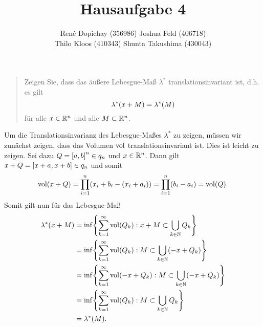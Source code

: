 \documentclass{exercise}
\title{Hausaufgabe 4}
\author{René Dopichay (356986) \quad Joshua Feld (406718)\\Thilo Kloos (410343) \quad Shunta Takushima (430043)}
\begin{document}
	\maketitle


	\section{}

    \begin{quote}
        Zeigen Sie, dass das äußere Lebesgue-Maß \(\lambda^*\) translationsinvariant ist, d.h. es gilt
        \[
            \lambda^*\parentheses*{x + M} = \lambda^*\parentheses*{M}
        \]
        für alle \(x \in \R^n\) und alle \(M \subset \R^n\).
    \end{quote}

    Um die Translationsinvarianz des Lebesgue-Maßes \(\lambda^*\) zu zeigen, müssen wir zunächst zeigen, dass das Volumen \(\vol\) translationsinvariant ist. Dies ist leicht zu zeigen.
    Sei dazu \(Q = \brackets*{a, b}^n \in q_n\) und \(x \in \R^n\).
    Dann gilt \(x + Q = \brackets*{x + a, x + b} \in q_n\) und somit
    \[
        \vol\parentheses*{x + Q} = \prod_{i = 1}^n \parentheses*{x_i + b_i - \parentheses*{x_i + a_i}} = \prod_{i = 1}^n \parentheses*{b_i - a_i} = \vol\parentheses*{Q}.
    \]
    Somit gilt nun für das Lebesgue-Maß
    \begin{align*}
        \lambda^*\parentheses*{x + M} &= \inf\braces*{\sum_{k = 1}^\infty \vol\parentheses*{Q_k} : x + M \subset \bigcup_{k \in \N}Q_k}\\
        &= \inf\braces*{\sum_{k = 1}^\infty \vol\parentheses*{Q_k} : M \subset \bigcup_{k \in \N}\parentheses*{-x + Q_k}}\\
        &= \inf\braces*{\sum_{k = 1}^\infty \vol\parentheses*{-x + Q_k} : M \subset \bigcup_{k \in \N}\parentheses*{-x + Q_k}}\\
        &= \inf\braces*{\sum_{k = 1}^\infty \vol\parentheses*{Q_k} : M \subset \bigcup_{k \in \N}Q_k}\\
        &= \lambda^*\parentheses*{M}.
    \end{align*}
    
    
    \section{}
    
\end{document}
